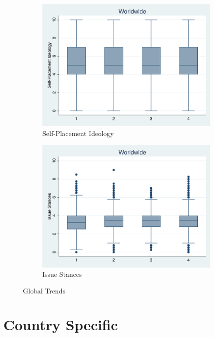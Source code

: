 \documentclass[12pt, titlepage]{article}
\begin{document}
\begin{figure}[H]
	\centering
	\begin{subfigure}[b]{0.475\textwidth}   
		\centering 
		\includegraphics[width=\textwidth]{IdeoBP/BoxAllIdeo}
		\caption{Self-Placement Ideology}
	\end{subfigure}
	\hfill
	\begin{subfigure}[b]{0.475\textwidth}
		\centering 
		\includegraphics[width=\textwidth]{BoxLib/BoxAllLib}
		\caption{Issue Stances}
	\end{subfigure}
	\caption{Global Trends}
	\label{Worldwide}
\end{figure}

\section{Country Specific}
\end{document}
